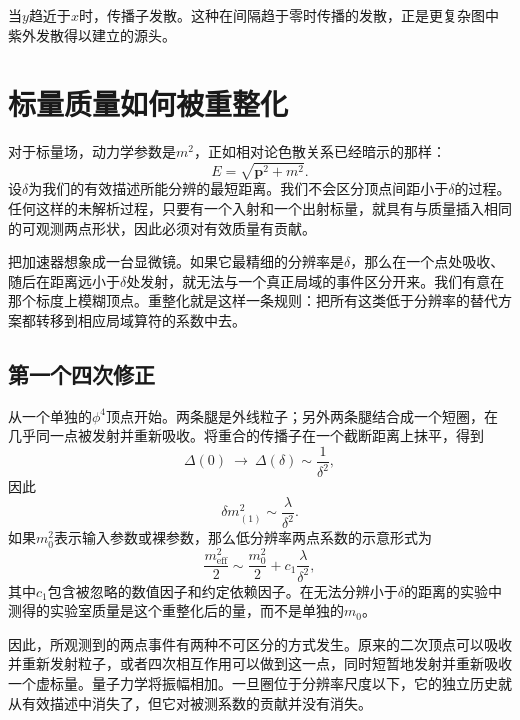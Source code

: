 当\(y\)趋近于\(x\)时，传播子发散。这种在间隔趋于零时传播的发散，正是更复杂图中紫外发散得以建立的源头。

\section{标量质量如何被重整化}

对于标量场，动力学参数是\(m^2\)，正如相对论色散关系已经暗示的那样：
\begin{equation}
E=\sqrt{\mathbf p^2+m^2}.
\end{equation}
设\(\delta\)为我们的有效描述所能分辨的最短距离。我们不会区分顶点间距小于\(\delta\)的过程。任何这样的未解析过程，只要有一个入射和一个出射标量，就具有与质量插入相同的可观测两点形状，因此必须对有效质量有贡献。

把加速器想象成一台显微镜。如果它最精细的分辨率是\(\delta\)，那么在一个点处吸收、随后在距离远小于\(\delta\)处发射，就无法与一个真正局域的事件区分开来。我们有意在那个标度上模糊顶点。重整化就是这样一条规则：把所有这类低于分辨率的替代方案都转移到相应局域算符的系数中去。

\subsection{第一个四次修正}

从一个单独的\(\phi^4\)顶点开始。两条腿是外线粒子；另外两条腿结合成一个短圈，在几乎同一点被发射并重新吸收。将重合的传播子在一个截断距离上抹平，得到
\begin{equation}
\Delta(0)\ \longrightarrow\ \Delta(\delta)\sim\frac{1}{\delta^2},
\end{equation}
因此
\begin{equation}
\delta m^2_{(1)}\sim\frac{\lambda}{\delta^2}.
\label{eq:one-loop-scalar-mass}
\end{equation}
如果\(m_0^2\)表示输入参数或裸参数，那么低分辨率两点系数的示意形式为
\begin{equation}
\frac{m_{\mathrm{eff}}^2}{2}
\sim
\frac{m_0^2}{2}
+c_1\frac{\lambda}{\delta^2},
\label{eq:first-renormalized-mass}
\end{equation}
其中\(c_1\)包含被忽略的数值因子和约定依赖因子。在无法分辨小于\(\delta\)的距离的实验中测得的实验室质量是这个重整化后的量，而不是单独的\(m_0\)。

因此，所观测到的两点事件有两种不可区分的方式发生。原来的二次顶点可以吸收并重新发射粒子，或者四次相互作用可以做到这一点，同时短暂地发射并重新吸收一个虚标量。量子力学将振幅相加。一旦圈位于分辨率尺度以下，它的独立历史就从有效描述中消失了，但它对被测系数的贡献并没有消失。


